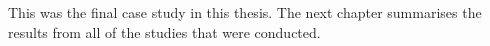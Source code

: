 This was the final case study in this thesis. The next chapter summarises the results from all of the studies that were conducted.

